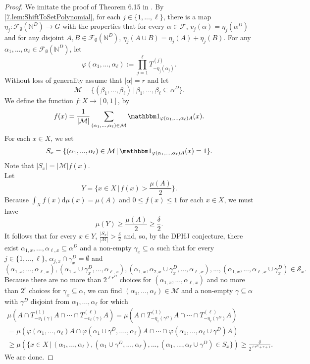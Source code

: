 \documentclass[11pt,american,preprint]{elsarticle}
\numberwithin{equation}{section}
\theoremstyle{plain}
\theoremstyle{plain*}
\theoremstyle{plain}
\theoremstyle{plain*}
\theoremstyle{plain}
\theoremstyle{plain*}
\theoremstyle{remark}
\theoremstyle{remark*}
\theoremstyle{remark}
\theoremstyle{remark*}
\theoremstyle{remark}
\theoremstyle{remark*}
\theoremstyle{plain}
\theoremstyle{definition}
\theoremstyle{plain}
\theoremstyle{plain} %
\newcommand{\N}{\mathbb{N}}
\begin{document}
 \begin{proof}
    We imitate the proof of Theorem 6.15 in \cite{berMcCuIPPolySzemeredi}. By \cref{7.lem:ShiftToSetPolynomial}, for each  $j\in\{1,...,\ell\}$, there is a map $\eta_j:\mathcal F_\emptyset (\N^D)\rightarrow G$ with the properties that for every $\alpha\in\mathcal F$, $v_{j}(\alpha)=\eta_j(\alpha^D)$ and for any disjoint $A,B\in \mathcal F_\emptyset(\N^D)$, $\eta_j(A\cup B)=\eta_j(A)+\eta_j(B)$. 
    For any $\alpha_1,...,\alpha_\ell\in\mathcal F_\emptyset (\N^D)$, let
     $$\varphi(\alpha_1,...,\alpha_\ell):=\prod_{j=1}^\ell T_{- \eta_j(\alpha_j)}^{(j)}.$$
Without loss of generality assume that $|\alpha|=r$ and let 
$$\mathcal M=\{(\beta_1,...,\beta_\ell)\,|\,\beta_1,...,\beta_\ell\subseteq \alpha^D\}.$$
We define the function $f:X\rightarrow [0,1]$, by
$$f(x)=\frac{1}{|\mathcal M|}\sum_{(\alpha_1,...,\alpha_\ell)\in\mathcal M} \mathbbm 1_{\varphi(\alpha_1,...,\alpha_\ell)A}(x).$$
For each $x\in X$, we set 
$$S_x=\{(\alpha_1,...,\alpha_\ell)\in\mathcal M\,|\,\mathbbm 1_{\varphi(\alpha_1,...,\alpha_\ell)A}(x)=1\}.$$
Note that $|S_x|=|\mathcal M|f(x)$.\\
 Let 
$$Y=\{x\in X\,|\,f(x)> \frac{
\mu(A)}{2}\}.$$
Because $\int_Xf(x)\text{d}
\mu(x)=\mu(A)$ and $0\leq f(x)\leq 1$ for each $x\in X$, we must have 
$$
\mu(Y)\geq \frac{\mu(A)}{2}\geq \frac{\delta}{2}.
$$
It follows that for every $x\in Y$, $\frac{|S_x|}{|\mathcal M|}> \frac{\delta}{2}$ and, so, by the DPHJ conjecture, there exist $\alpha_{1,x},...,\alpha_{\ell,x}\subseteq \alpha^D$ and a non-empty $\gamma_x\subseteq \alpha$ such that for every $j\in\{1,...,\ell\}$, $\alpha_{j,x}\cap \gamma_x^D=\emptyset$  and 
\begin{equation}\label{8.eq:WildCard}
(\alpha_{1,x},...,\alpha_{\ell,x}),(\alpha_{1,x}\cup\gamma_x^D,...,\alpha_{\ell,x}),(\alpha_{1,x},\alpha_{2,x}\cup\gamma_x^D,...,\alpha_{\ell,x}),...,(\alpha_{1,x},...,\alpha_{\ell,x}\cup\gamma_x^D)\in\mathcal S_x.
\end{equation}
 Because there are no more than  $2^{\ell r^D}$ choices for $(\alpha_{1,x},...,\alpha_{\ell,x})$ and no more than $2^r$ choices for $\gamma_x\subseteq \alpha$, we can find $(\alpha_1,...,\alpha_\ell)\in \mathcal M$ and a non-empty $\gamma\subseteq \alpha$ with $\gamma^D$ disjoint from  $\alpha_1,...,\alpha_\ell$ for which
 \begin{multline*}
     \mu(A\cap T_{-v_1(\gamma)}^{(1)}A\cap \cdots\cap T_{-v_\ell(\gamma)}^{(\ell)}A)
     =\mu(A\cap T_{-\eta_1(\gamma^D)}^{(1)}A\cap \cdots\cap T_{-\eta_\ell(\gamma^D)}^{(\ell)}A)\\
    =\mu(\varphi(\alpha_1,...,\alpha_\ell)A\cap \varphi(\alpha_1\cup\gamma^D,....,\alpha_\ell)A\cap \cdots\cap \varphi(\alpha_1,...,\alpha_\ell\cup\gamma^D)A)\\
     \geq \mu(\{x\in X\,|\, (\alpha_1,...,\alpha_\ell),(\alpha_1\cup \gamma^D,...,\alpha_\ell),...,(\alpha_1,...,\alpha_\ell\cup \gamma^D)\in S_x\})\geq \frac{\delta}{2^{\ell r^D+r+1}}.
 \end{multline*} 
 We are done. 
 \end{proof}
\end{document}
